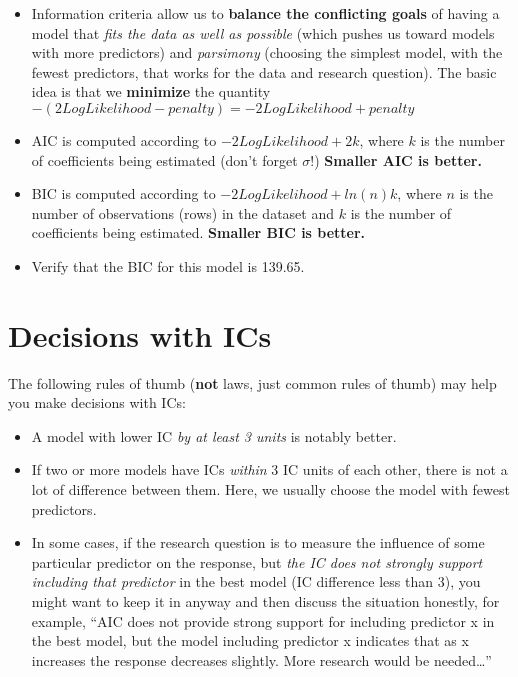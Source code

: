 \documentclass[]{book}
\providecommand{\tightlist}{%
  \setlength{\itemsep}{0pt}\setlength{\parskip}{0pt}}
\begin{document}
\begin{itemize}
\item
  Information criteria allow us to \textbf{balance the conflicting goals} of having a model that \emph{fits the data as well as possible} (which pushes us toward models with more predictors) and \emph{parsimony} (choosing the simplest model, with the fewest predictors, that works for the data and research question). The basic idea is that we \textbf{minimize} the quantity \(-(2LogLikelihood - penalty) = -2LogLikelihood + penalty\)
\item
  AIC is computed according to \(-2LogLikelihood +2k\), where \(k\) is the number of coefficients being estimated (don't forget \(\sigma\)!) \textbf{Smaller AIC is better.}
\item
  BIC is computed according to \(-2LogLikelihood + ln(n)k\), where \(n\) is the number of observations (rows) in the dataset and \(k\) is the number of coefficients being estimated. \textbf{Smaller BIC is better.}
\item
  Verify that the BIC for this model is 139.65.
\end{itemize}

\hypertarget{decisions-with-ics}{%
\section{Decisions with ICs}\label{decisions-with-ics}}

The following rules of thumb (\textbf{not} laws, just common rules of thumb) may help you make decisions with ICs:

\begin{itemize}
\tightlist
\item
  A model with lower IC \emph{by at least 3 units} is notably better.
\item
  If two or more models have ICs \emph{within} 3 IC units of each other, there is not a lot of difference between them. Here, we usually choose the model with fewest predictors.
\item
  In some cases, if the research question is to measure the influence of some particular predictor on the response, but \emph{the IC does not strongly support including that predictor} in the best model (IC difference less than 3), you might want to keep it in anyway and then discuss the situation honestly, for example, ``AIC does not provide strong support for including predictor x in the best model, but the model including predictor x indicates that as x increases the response decreases slightly. More research would be needed\ldots{}''
\end{itemize}
\end{document}
